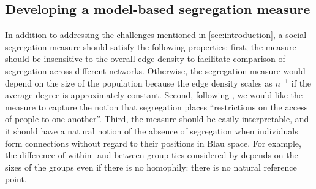 \documentclass{scrartcl}
\newcommand{\card}[1]{\left|#1\right|}
\newcommand{\seeds}{U}
\newcommand{\nominees}{V}
\begin{document}

\subsection{Developing a model-based segregation measure}

In addition to addressing the challenges mentioned in \cref{sec:introduction}, a social segregation measure should satisfy the following properties: first, the measure should be insensitive to the overall edge density to facilitate comparison of segregation across different networks. Otherwise, the segregation measure would depend on the size of the population because the edge density scales as $n^{-1}$ if the average degree is approximately constant. Second, following \textcite{Freeman1978}, we would like the measure to capture the notion that segregation places ``restrictions on the access of people to one another''. Third, the measure should be easily interpretable, and it should have a natural notion of the absence of segregation when individuals form connections without regard to their positions in Blau space. For example, the difference of within- and between-group ties considered by \textcite{Krackhardt1988} depends on the sizes of the groups even if there is no homophily: there is no natural reference point.
\end{document}

